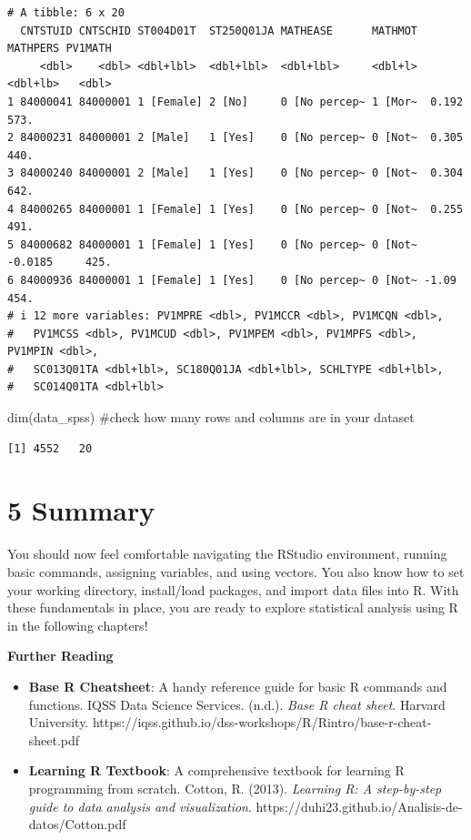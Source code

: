 \documentclass[
  letterpaper,
  DIV=11,
  numbers=noendperiod]{scrreprt}
\newenvironment{Shaded}{\begin{snugshade}}{\end{snugshade}}
\newcommand{\CommentTok}[1]{\textcolor[rgb]{0.37,0.37,0.37}{#1}}
\newcommand{\FunctionTok}[1]{\textcolor[rgb]{0.28,0.35,0.67}{#1}}
\newcommand{\NormalTok}[1]{\textcolor[rgb]{0.00,0.23,0.31}{#1}}
\begin{document}
\begin{verbatim}
# A tibble: 6 x 20
  CNTSTUID CNTSCHID ST004D01T  ST250Q01JA MATHEASE      MATHMOT MATHPERS PV1MATH
     <dbl>    <dbl> <dbl+lbl>  <dbl+lbl>  <dbl+lbl>     <dbl+l> <dbl+lb>   <dbl>
1 84000041 84000001 1 [Female] 2 [No]     0 [No percep~ 1 [Mor~  0.192      573.
2 84000231 84000001 2 [Male]   1 [Yes]    0 [No percep~ 0 [Not~  0.305      440.
3 84000240 84000001 2 [Male]   1 [Yes]    0 [No percep~ 0 [Not~  0.304      642.
4 84000265 84000001 1 [Female] 1 [Yes]    0 [No percep~ 0 [Not~  0.255      491.
5 84000682 84000001 1 [Female] 1 [Yes]    0 [No percep~ 0 [Not~ -0.0185     425.
6 84000936 84000001 1 [Female] 1 [Yes]    0 [No percep~ 0 [Not~ -1.09       454.
# i 12 more variables: PV1MPRE <dbl>, PV1MCCR <dbl>, PV1MCQN <dbl>,
#   PV1MCSS <dbl>, PV1MCUD <dbl>, PV1MPEM <dbl>, PV1MPFS <dbl>, PV1MPIN <dbl>,
#   SC013Q01TA <dbl+lbl>, SC180Q01JA <dbl+lbl>, SCHLTYPE <dbl+lbl>,
#   SC014Q01TA <dbl+lbl>
\end{verbatim}

\begin{Shaded}
\begin{Highlighting}[]
\FunctionTok{dim}\NormalTok{(data\_spss) }\CommentTok{\#check how many rows and columns are in your dataset}
\end{Highlighting}
\end{Shaded}

\begin{verbatim}
[1] 4552   20
\end{verbatim}

\section*{5 Summary}\label{summary}


You should now feel comfortable navigating the RStudio environment,
running basic commands, assigning variables, and using vectors. You also
know how to set your working directory, install/load packages, and
import data files into R. With these fundamentals in place, you are
ready to explore statistical analysis using R in the following chapters!

\textbf{Further Reading}

\begin{itemize}
\item
  \textbf{Base R Cheatsheet}: A handy reference guide for basic R
  commands and functions. IQSS Data Science Services. (n.d.). \emph{Base
  R cheat sheet}. Harvard University.
  https://iqss.github.io/dss-workshops/R/Rintro/base-r-cheat-sheet.pdf
\item
  \textbf{Learning R Textbook}: A comprehensive textbook for learning R
  programming from scratch. Cotton, R. (2013). \emph{Learning R: A
  step-by-step guide to data analysis and visualization}.
  https://duhi23.github.io/Analisis-de-datos/Cotton.pdf
\end{itemize}
\end{document}

